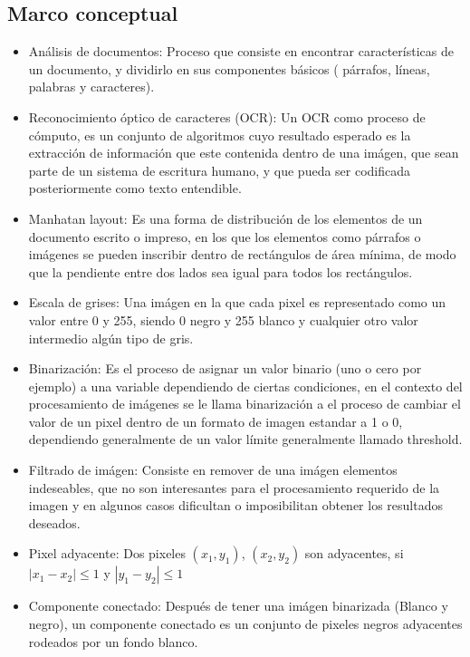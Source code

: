 \documentclass[a4paper, 11pt, oneside]{article}
\begin{document}
	\subsection{Marco conceptual}
	\begin{itemize}
    \item Análisis de documentos: Proceso que consiste en encontrar características de un documento,
    	y dividirlo en sus componentes básicos ( párrafos, líneas, palabras y caracteres).
    \item Reconocimiento óptico de caracteres (OCR): Un OCR como proceso de cómputo, es un conjunto de
    algoritmos cuyo resultado esperado es la extracción de información  que este contenida dentro de
    una imágen, que sean parte de un sistema de escritura humano, y que pueda ser codificada
    posteriormente como texto entendible.
    \item Manhatan layout: Es una forma de distribución de los elementos de un documento escrito o
    impreso, en los que los elementos como párrafos o imágenes se pueden inscribir
    dentro de rectángulos de área mínima, de modo que la pendiente entre dos lados sea igual para
    todos los rectángulos.
    \item Escala de grises: Una imágen en la que cada pixel es representado como un valor entre 0 y
    255, siendo 0 negro y 255 blanco y cualquier otro valor intermedio algún tipo de gris.
    \item Binarización:	Es el proceso de asignar un valor binario (uno o cero por ejemplo) a una
    variable dependiendo de	ciertas condiciones, en el contexto del procesamiento de imágenes se le
    llama binarización a el proceso de cambiar el valor de un pixel dentro de un formato de imagen
    estandar a 1 o 0, dependiendo generalmente de un valor límite generalmente llamado threshold.
    \item Filtrado de imágen: Consiste en remover de una imágen elementos indeseables, que no
    son interesantes para el procesamiento requerido de la imagen y en algunos casos dificultan
    o imposibilitan obtener los resultados deseados.
    \item Pixel adyacente: Dos pixeles $(x_1,y_1)$, $(x_2,y_2)$ son adyacentes, si $|x_1-x_2| \le 1$
    y $|y_1-y_2| \le 1$
    \item Componente conectado: Después de tener una imágen binarizada (Blanco y negro), un
    componente conectado es un conjunto de pixeles negros adyacentes rodeados por un fondo blanco.
   
	\end{itemize}
	
\end{document}
